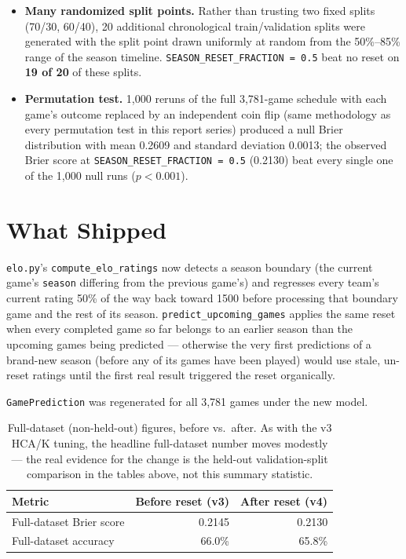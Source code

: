 \documentclass[11pt]{article}
\newcommand{\code}[1]{\allowbreak\texttt{\small #1}\allowbreak}
\begin{document}
\begin{itemize}
    \item \textbf{Many randomized split points.} Rather than trusting two fixed splits (70/30, 60/40), 20
    additional chronological train/validation splits were generated with the split point drawn uniformly at
    random from the 50\%–85\% range of the season timeline. \code{SEASON\_RESET\_FRACTION = 0.5} beat no
    reset on \textbf{19 of 20} of these splits.
    \item \textbf{Permutation test.} 1,000 reruns of the full 3,781-game schedule with each game's outcome
    replaced by an independent coin flip (same methodology as every permutation test in this report series)
    produced a null Brier distribution with mean 0.2609 and standard deviation 0.0013; the observed Brier
    score at \code{SEASON\_RESET\_FRACTION = 0.5} (0.2130) beat every single one of the 1,000 null runs
    ($p < 0.001$).
\end{itemize}

\section{What Shipped}

\code{elo.py}'s \code{compute\_elo\_ratings} now detects a season boundary (the current game's \code{season}
differing from the previous game's) and regresses every team's current rating 50\% of the way back toward
1500 before processing that boundary game and the rest of its season. \code{predict\_upcoming\_games} applies
the same reset when every completed game so far belongs to an earlier season than the upcoming games being
predicted — otherwise the very first predictions of a brand-new season (before any of its games have been
played) would use stale, un-reset ratings until the first real result triggered the reset organically.

\code{GamePrediction} was regenerated for all 3,781 games under the new model.

\begin{table}[h]
\centering
\small
\begin{tabular}{lrr}
\toprule
Metric & Before reset (v3) & After reset (v4) \\
\midrule
Full-dataset Brier score & 0.2145 & 0.2130 \\
Full-dataset accuracy & 66.0\% & 65.8\% \\
\bottomrule
\end{tabular}
\caption{Full-dataset (non-held-out) figures, before vs.\ after. As with the v3 HCA/K tuning, the headline
full-dataset number moves modestly — the real evidence for the change is the held-out validation-split
comparison in the tables above, not this summary statistic.}
\end{table}
\end{document}
